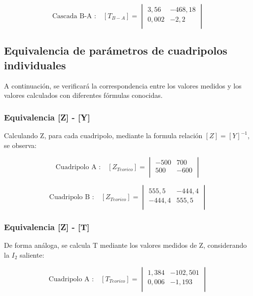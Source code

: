 \documentclass[a4paper]{article}
\begin{document}
\begin{equation}
\text{Cascada B-A :}\quad [T_{B-A}] =
\begin{vmatrix}
	3,56 & -468,18\\
	0,002 & -2,2\\
\end{vmatrix}
\end{equation}

\subsection*{Equivalencia de parámetros de cuadripolos individuales}

A continuación, se verificará la correspondencia entre los valores medidos y los valores calculados con diferentes fórmulas conocidas.

\subsubsection*{Equivalencia [Z] - [Y]}

Calculando Z, para cada cuadripolo, mediante la formula relación $[Z]=[Y]^{-1}$, se observa:

\begin{equation}
\text{Cuadripolo A :}\quad [Z_{Teorico}] =
\begin{vmatrix}
	-500 & 700\\
	500 & -600\\
\end{vmatrix}
\end{equation}

\begin{equation}
\text{Cuadripolo B :}\quad [Z_{Teorico}] =
\begin{vmatrix}
	555,5 & -444,4\\
	 -444,4 & 555,5\\
\end{vmatrix}
\end{equation}

\subsubsection*{Equivalencia [Z] - [T]}

De forma análoga, se calcula T mediante los valores medidos de Z, considerando la $I_2$ saliente: 

\begin{equation}
\text{Cuadripolo A :}\quad [T_{Teorico}] =
\begin{vmatrix}
	1,384 & -102,501\\
	0,006 & -1,193\\
\end{vmatrix}
\end{equation}
\end{document}
